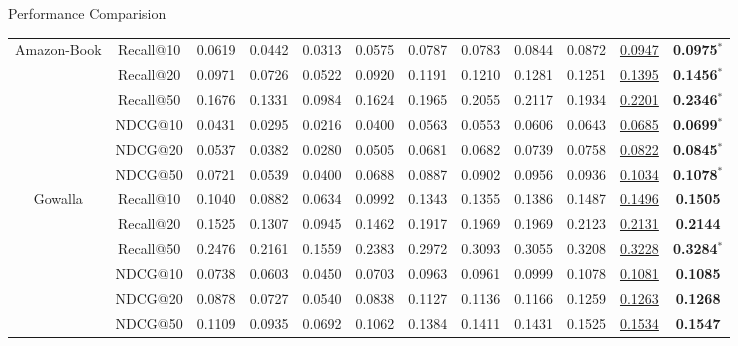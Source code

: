 \documentclass[t]{beamer}
\begin{document}
\begin{frame}{Performance Comparision}
\begin{table}
{\begin{tabular}{@{}c|c|ccc|ccc|cccc}
\multirow{6}{*}{Amazon-Book} 
& Recall@10 & 0.0619 & 0.0442 & 0.0313 & 0.0575 & 0.0787 & 0.0783 & 0.0844 & 0.0872 &\underline{0.0947} & \textbf{0.0975}$^*$ \\
& Recall@20 & 0.0971 & 0.0726 & 0.0522 & 0.0920 & 0.1191 & 0.1210 & 0.1281 & 0.1251 & \underline{0.1395} & \textbf{0.1456}$^*$  \\
& Recall@50 & 0.1676 & 0.1331 & 0.0984 & 0.1624 & 0.1965 & 0.2055 & 0.2117 & 0.1934 & \underline{0.2201} & \textbf{0.2346}$^*$ \\
& NDCG@10 & 0.0431 & 0.0295 & 0.0216 & 0.0400 & 0.0563 & 0.0553 & 0.0606 & 0.0643 & \underline{0.0685} & \textbf{0.0699}$^*$\\
& NDCG@20 & 0.0537 & 0.0382 & 0.0280 & 0.0505 & 0.0681 & 0.0682 & 0.0739 & 0.0758 & \underline{0.0822} & \textbf{0.0845}$^*$  \\
& NDCG@50 & 0.0721 & 0.0539 & 0.0400 & 0.0688 & 0.0887 & 0.0902 & 0.0956 & 0.0936 &\underline{0.1034} & \textbf{0.1078}$^*$\\
 \midrule
 


\multirow{6}{*}{Gowalla} 
& Recall@10 & 0.1040 & 0.0882 & 0.0634 & 0.0992 & 0.1343 & 0.1355 & 0.1386 & 0.1487  & \underline{0.1496} & \textbf{0.1505} \\
& Recall@20 & 0.1525 & 0.1307 & 0.0945 & 0.1462 & 0.1917 & 0.1969 & 0.1969 & 0.2123 & \underline{0.2131} & \textbf{0.2144}  \\
& Recall@50 & 0.2476 & 0.2161 & 0.1559 & 0.2383 & 0.2972 & 0.3093 & 0.3055 & 0.3208 & \underline{0.3228} & \textbf{0.3284}$^*$  \\
& NDCG@10 & 0.0738 & 0.0603 & 0.0450 & 0.0703 & 0.0963 & 0.0961 & 0.0999 & 0.1078 & \underline{0.1081} & \textbf{0.1085}  \\
& NDCG@20 & 0.0878 & 0.0727 & 0.0540 & 0.0838 & 0.1127 & 0.1136 & 0.1166 & 0.1259 & \underline{0.1263} & \textbf{0.1268}  \\
& NDCG@50 & 0.1109 & 0.0935 & 0.0692 & 0.1062 & 0.1384 & 0.1411 & 0.1431 & 0.1525 & \underline{0.1534} & \textbf{0.1547}  \\
\midrule




\end{tabular}}
\end{table}
\end{frame}
\end{document}
